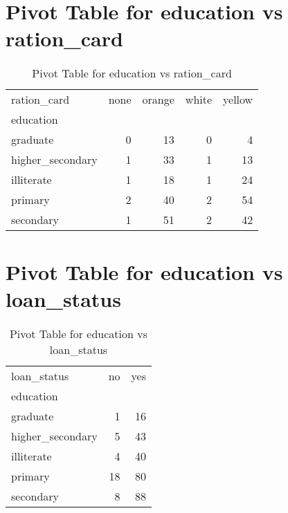 \documentclass{article}
\begin{document}
\section{Pivot Table for education vs ration_card}
\begin{table}
\caption{Pivot Table for education vs ration_card}
\label{tab:education_ration_card}
\begin{tabular}{lrrrr}
\toprule
ration_card & none & orange & white & yellow \\
education &  &  &  &  \\
\midrule
graduate & 0 & 13 & 0 & 4 \\
higher\_secondary & 1 & 33 & 1 & 13 \\
illiterate & 1 & 18 & 1 & 24 \\
primary & 2 & 40 & 2 & 54 \\
secondary & 1 & 51 & 2 & 42 \\
\bottomrule
\end{tabular}
\end{table}

\section{Pivot Table for education vs loan_status}
\begin{table}
\caption{Pivot Table for education vs loan_status}
\label{tab:education_loan_status}
\begin{tabular}{lrr}
\toprule
loan_status & no & yes \\
education &  &  \\
\midrule
graduate & 1 & 16 \\
higher\_secondary & 5 & 43 \\
illiterate & 4 & 40 \\
primary & 18 & 80 \\
secondary & 8 & 88 \\
\bottomrule
\end{tabular}
\end{table}
\end{document}
